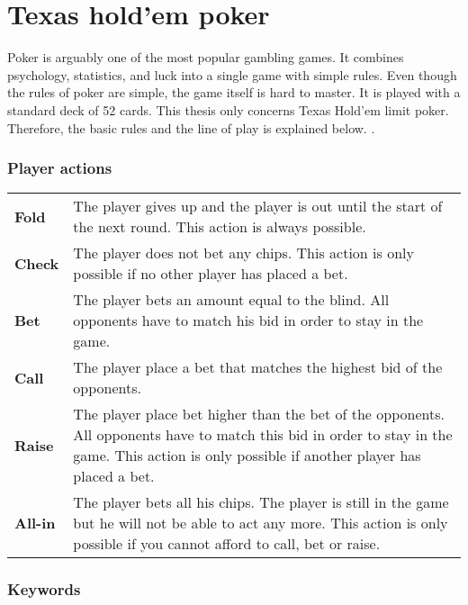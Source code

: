 \section*{Texas hold'em poker}
Poker is arguably one of the most popular gambling games. It combines psychology, statistics, and luck into a single game with simple rules. Even though the rules of poker are simple, the game itself is hard to master. It is played with a standard deck of 52 cards. This thesis only concerns Texas Hold'em limit poker. Therefore, the basic rules and the line of play is explained below. \cite{poker-rules}.

\subsubsection*{Player actions}
\begin{tabular}{ p{0.1\linewidth} p{0.9\linewidth} }
  \textbf{Fold} & The player gives up and the player is out until the start of the next round. This action is always possible.\\
  \textbf{Check} & The player does not bet any chips. This action is only possible if no other player has placed a bet.\\
  \textbf{Bet} & The player bets an amount equal to the blind. All opponents have to match his bid in order to stay in the game.\\
  \textbf{Call} & The player place a bet that matches the highest bid of the opponents.\\
  \textbf{Raise} & The player place bet higher than the bet of the opponents. All opponents have to match this bid in order to stay in the game. This action is only possible if another player has placed a bet.\\
  \textbf{All-in} & The player bets all his chips. The player is still in the game but he will not be able to act any more. This action is only possible if you cannot afford to call, bet or raise.\\
\end{tabular}

\subsubsection*{Keywords}

